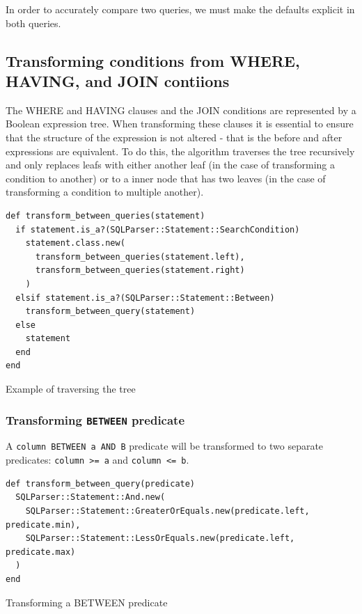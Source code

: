 In order to accurately compare two queries, we must make the defaults explicit in both queries.

\subsection{Transforming conditions from WHERE, HAVING, and JOIN contiions}
The WHERE and HAVING clauses and the JOIN conditions are represented by a Boolean expression tree. When transforming these clauses it is essential to ensure that the structure of the expression is not altered - that is the before and after expressions are equivalent. To do this, the algorithm traverses the tree recursively and only replaces leafs with either another leaf (in the case of transforming a condition to another) or to a inner node that has two leaves (in the case of transforming a condition to multiple another).

\begin{listing}[H]
\begin{verbatim}
def transform_between_queries(statement)
  if statement.is_a?(SQLParser::Statement::SearchCondition)
    statement.class.new(
      transform_between_queries(statement.left),
      transform_between_queries(statement.right)
    )
  elsif statement.is_a?(SQLParser::Statement::Between)
    transform_between_query(statement)
  else
    statement
  end
end
\end{verbatim}
\caption{Example of traversing the tree}
\end{listing}

\subsubsection{Transforming \texttt{BETWEEN} predicate}

A \texttt{column BETWEEN a AND B} predicate will be transformed to two separate predicates: \texttt{column >= a} and \texttt{column <= b}. 

\begin{listing}[ht]
\begin{verbatim}
def transform_between_query(predicate)
  SQLParser::Statement::And.new(
    SQLParser::Statement::GreaterOrEquals.new(predicate.left, predicate.min),
    SQLParser::Statement::LessOrEquals.new(predicate.left, predicate.max)
  )
end
\end{verbatim}
\caption{Transforming a BETWEEN predicate}
\label{fig:transforming_a_betweeb}
\end{listing}

